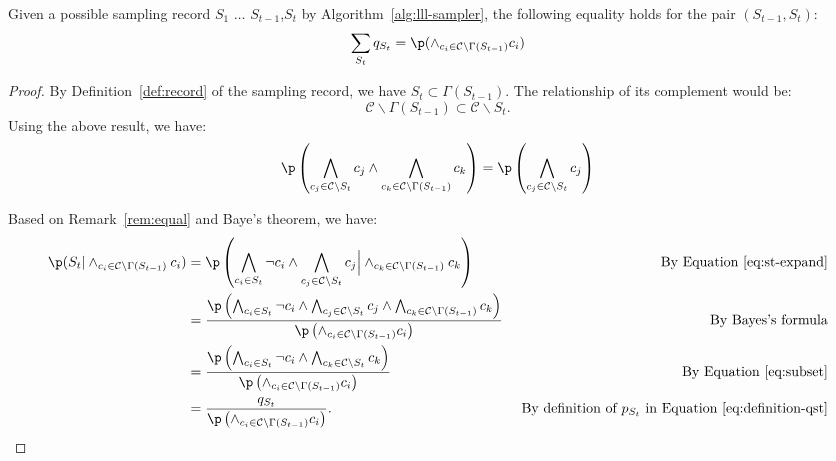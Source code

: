 \begin{lemma} \label{eq:pair-prob}
Given a possible sampling record $S_1$ $\ldots$ $S_{t-1}$,$S_t$ by Algorithm~\ref{alg:lll-sampler}, the following equality holds for the pair $(S_{t-1},S_t)$:
\begin{equation*}
\sum_{S_t}q_{S_t}=\p(\wedge_{c_i \in \mathcal{C}\backslash \Gamma(S_{t-1})}c_i)
\end{equation*}
\begin{proof}
By Definition~\ref{def:record} of the sampling record, we have $S_t \subset \Gamma(S_{t-1})$. The  relationship of its complement would be:
\begin{equation*}
\mathcal{C}\backslash\Gamma(S_{t-1})\subset \mathcal{C}\backslash S_t.
\end{equation*}
Using the above result, we have:
\begin{equation}\label{eq:subset}
\p\left(\bigwedge_{c_j \in \mathcal{C}\backslash S_t}c_j \wedge \bigwedge_{c_k \in \mathcal{C}\backslash \Gamma(S_{t-1})}c_k \right)=
\p\left(\bigwedge_{c_j \in \mathcal{C}\backslash S_t}c_j \right)
\end{equation}

Based on Remark~\ref{rem:equal} and Baye's theorem, we have:
\begin{equation} \label{eq:bayes}
\begin{aligned}
\p(S_t |\wedge_{c_i \in \mathcal{C}\backslash \Gamma(S_{t-1})}c_i)&=\p\left(\bigwedge_{c_i \in S_t}\neg{c}_i \wedge \bigwedge_{c_j \in \mathcal{C}\backslash S_t}c_j \Big| \wedge_{c_k \in \mathcal{C}\backslash \Gamma(S_{t-1})}c_k \right) & \text{ By Equation~\eqref{eq:st-expand}}\\
&=\frac{\p\left(\bigwedge_{c_i \in S_t}\neg{c}_i \wedge \bigwedge_{c_j \in \mathcal{C}\backslash S_t}c_j \wedge \bigwedge_{c_k \in \mathcal{C}\backslash \Gamma(S_{t-1})}c_k \right)}{\p \left(\wedge_{c_i \in \mathcal{C}\backslash \Gamma(S_{t-1})}c_i\right) } &\text{By Bayes's formula}\\
&=\frac{\p\left(\bigwedge_{c_i \in S_t}\neg{c}_i \wedge \bigwedge_{c_k \in \mathcal{C}\backslash S_{t}}c_k \right)}{\p \left(\wedge_{c_i \in \mathcal{C}\backslash \Gamma(S_{t-1})}c_i\right) } &\text{ By Equation~\eqref{eq:subset}}\\
&= \frac{q_{S_t} }{\p \left(\wedge_{c_i \in \mathcal{C}\backslash \Gamma(S_{t-1})}c_i\right) }. &\text{ By definition of $p_{S_t}$ in Equation~\eqref{eq:definition-qst}}
\end{aligned}
\end{equation}


\end{proof}
\end{lemma}
